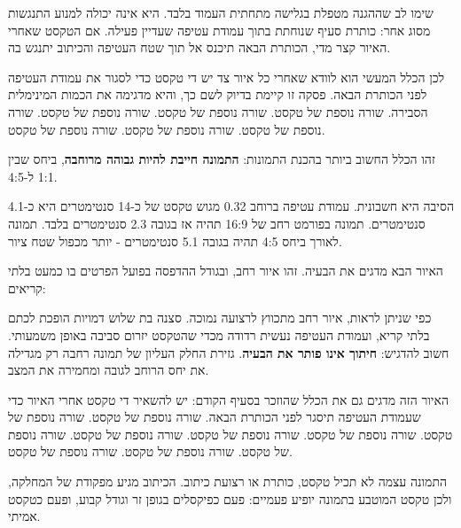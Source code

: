 \documentclass{hebrew-academic-template}
\begin{document}
שימו לב שההגנה מטפלת בגלישה מתחתית העמוד בלבד. היא אינה יכולה למנוע התנגשות
מסוג אחר: כותרת סעיף שנוחתת בתוך עמודת עטיפה שעדיין פעילה. אם הטקסט שאחרי
האיור קצר מדי, הכותרת הבאה תיכנס אל תוך שטח העטיפה והכיתוב יתנגש בה.

לכן הכלל המעשי הוא לוודא שאחרי כל איור צד יש די טקסט כדי לסגור את עמודת
העטיפה לפני הכותרת הבאה. פסקה זו קיימת בדיוק לשם כך, והיא מדגימה את הכמות
המינימלית הסבירה. שורה נוספת של טקסט. שורה נוספת של טקסט. שורה נוספת של
טקסט. שורה נוספת של טקסט. שורה נוספת של טקסט. שורה נוספת של טקסט.




זהו הכלל החשוב ביותר בהכנת התמונות: \textbf{התמונה חייבת להיות גבוהה מרוחבה},
ביחס שבין \num{1}:\num{1} ל-\num{4}:\num{5}.

הסיבה היא חשבונית. עמודת עטיפה ברוחב \num{0.32} מגוש טקסט של כ-\num{14}
סנטימטרים היא כ-\num{4.1} סנטימטרים. תמונה בפורמט רחב של \num{16}:\num{9}
תהיה אז בגובה \num{2.3} סנטימטרים בלבד. תמונה לאורך ביחס \num{4}:\num{5}
תהיה בגובה \num{5.1} סנטימטרים - יותר מכפול שטח ציור.

האיור הבא מדגים את הבעיה. זהו איור רחב, ובגודל ההדפסה בפועל הפרטים בו כמעט
בלתי קריאים:

כפי שניתן לראות, איור רחב מתכווץ לרצועה נמוכה. סצנה בת שלוש דמויות הופכת
לכתם בלתי קריא, ועמודת העטיפה נעשית רדודה מכדי שהטקסט יזרום סביבה באופן
משמעותי. חשוב להדגיש: \textbf{חיתוך אינו פותר את הבעיה}. גזירת החלק העליון של
תמונה רחבה רק מגדילה את יחס הרוחב לגובה ומחמירה את המצב.

האיור הזה מדגים גם את הכלל שהוזכר בסעיף הקודם: יש להשאיר די טקסט אחרי האיור
כדי שעמודת העטיפה תיסגר לפני הכותרת הבאה. שורה נוספת של טקסט. שורה נוספת של
טקסט. שורה נוספת של טקסט. שורה נוספת של טקסט. שורה נוספת של טקסט. שורה נוספת
של טקסט. שורה נוספת של טקסט. שורה נוספת של טקסט.


התמונה עצמה לא תכיל טקסט, כותרת או רצועת כיתוב. הכיתוב מגיע מפקודת
 של המחלקה, ולכן טקסט המוטבע בתמונה יופיע פעמיים:
פעם כפיקסלים בגופן זר וגודל קבוע, ופעם כטקסט אמיתי.
\end{document}
